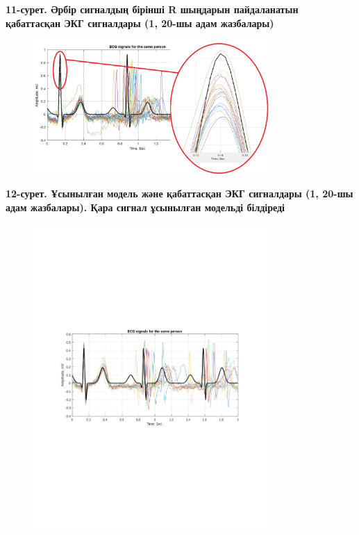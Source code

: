 {{\bfseries 11-сурет. Әрбір сигналдың бірінші R шыңдарын пайдаланатын
қабаттасқан ЭКГ сигналдары (1, 20-шы адам жазбалары)}

\begin{figure}[H]
	\centering
	\includegraphics[width=0.8\textwidth]{media/ict/image52}
	\caption*{}
\end{figure}


{\bfseries 12-сурет. Ұсынылған модель және қабаттасқан ЭКГ сигналдары (1,
20-шы адам жазбалары). Қара сигнал ұсынылған модельді білдіреді}

\begin{figure}[H]
	\centering
	\includegraphics[width=0.8\textwidth]{media/ict/image53}
	\caption*{}
\end{figure}


}
